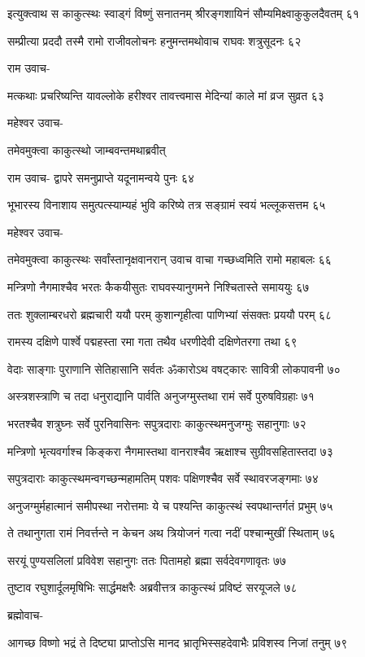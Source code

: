 इत्युक्त्वाथ स काकुत्स्थः स्वाड्गं विष्णुं सनातनम्
श्रीरङ्गशायिनं सौम्यमिक्ष्वाकुकुलदैवतम् ६१

सम्प्रीत्या प्रददौ तस्मै रामो राजीवलोचनः
हनुमन्तमथोवाच राघवः शत्रुसूदनः ६२

राम उवाच-

मत्कथाः प्रचरिष्यन्ति यावल्लोके हरीश्वर
तावत्त्वमास मेदिन्यां काले मां व्रज सुव्रत ६३

महेश्वर उवाच-

तमेवमुक्त्वा काकुत्स्थो जाम्बवन्तमथाब्रवीत्

राम उवाच-
द्वापरे समनुप्राप्ते यदूनामन्वये पुनः ६४

भूभारस्य विनाशाय समुत्पत्स्याम्यहं भुवि
करिष्ये तत्र सङ्ग्रामं स्वयं भल्लूकसत्तम ६५

महेश्वर उवाच-

तमेवमुक्त्वा काकुत्स्थः सर्वांस्तानृक्षवानरान्
उवाच वाचा गच्छध्वमिति रामो महाबलः ६६

मन्त्रिणो नैगमाश्चैव भरतः कैकयीसुतः
राघवस्यानुगमने निश्चितास्ते समाययुः ६७

ततः शुक्लाम्बरधरो ब्रह्मचारी ययौ परम्
कुशान्गृहीत्वा पाणिभ्यां संसक्तः प्रययौ परम् ६८

रामस्य दक्षिणे पार्श्वे पद्महस्ता रमा गता
तथैव धरणीदेवी दक्षिणेतरगा तथा ६९

वेदाः साङ्गाः पुराणानि सेतिहासानि सर्वतः
ॐकारोऽथ वषट्कारः सावित्री लोकपावनी ७०

अस्त्रशस्त्राणि च तदा धनुराद्यानि पार्वति
अनुजग्मुस्तथा रामं सर्वे पुरुषविग्रहाः ७१

भरतश्चैव शत्रुघ्नः सर्वे पुरनिवासिनः
सपुत्रदाराः काकुत्स्थमनुजग्मुः सहानुगाः ७२

मन्त्रिणो भृत्यवर्गाश्च किङ्करा नैगमास्तथा
वानराश्चैव ऋक्षाश्च सुग्रीवसहितास्तदा ७३

सपुत्रदाराः काकुत्स्थमन्वगच्छन्महामतिम्
पशवः पक्षिणश्चैव सर्वे स्थावरजङ्गमाः ७४

अनुजग्मुर्महात्मानं समीपस्था नरोत्तमाः
ये च पश्यन्ति काकुत्स्थं स्वपथान्तर्गतं प्रभुम् ७५

ते तथानुगता रामं निवर्त्तन्ते न केचन
अथ त्रियोजनं गत्वा नदीं पश्चान्मुखीं स्थिताम् ७६

सरयूं पुण्यसलिलां प्रविवेश सहानुगः
ततः पितामहो ब्रह्मा सर्वदेवगणावृतः ७७

तुष्टाव रघुशार्दूलमृषिभिः सार्द्धमक्षरैः
अब्रवीत्तत्र काकुत्स्थं प्रविष्टं सरयूजले ७८

ब्रह्मोवाच-

आगच्छ विष्णो भद्रं ते दिष्ट्या प्राप्तोऽसि मानद
भ्रातृभिस्सहदेवाभैः प्रविशस्व निजां तनुम् ७९

